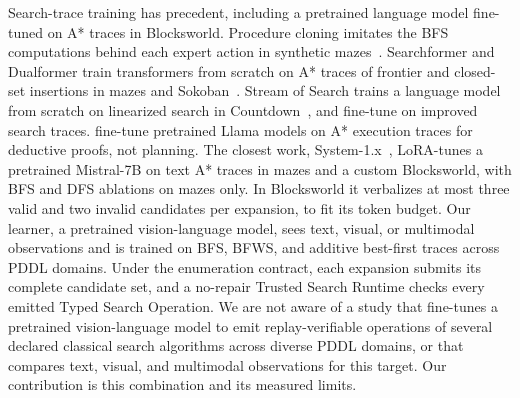 Search-trace training has precedent, including a pretrained language model fine-tuned on A* traces in Blocksworld. Procedure cloning imitates the BFS computations behind each expert action in synthetic mazes~\citep{yang2022chain}. Searchformer and Dualformer train transformers from scratch on A* traces of frontier and closed-set insertions in mazes and Sokoban~\citep{lehnert2024beyond,su2024dualformer}. Stream of Search trains a language model from scratch on linearized search in Countdown~\citep{gandhi2024stream}, and \citet{moon2024learning} fine-tune on improved search traces. \citet{opedal2026learning} fine-tune pretrained Llama models on A* execution traces for deductive proofs, not planning. The closest work, System-1.x~\citep{saha2024system1x}, LoRA-tunes a pretrained Mistral-7B on text A* traces in mazes and a custom Blocksworld, with BFS and DFS ablations on mazes only. In Blocksworld it verbalizes at most three valid and two invalid candidates per expansion, to fit its token budget. Our learner, a pretrained vision-language model, sees text, visual, or multimodal observations and is trained on BFS, BFWS, and additive best-first traces across PDDL domains. Under the enumeration contract, each expansion submits its complete candidate set, and a no-repair Trusted Search Runtime checks every emitted Typed Search Operation. We are not aware of a study that fine-tunes a pretrained vision-language model to emit replay-verifiable operations of several declared classical search algorithms across diverse PDDL domains, or that compares text, visual, and multimodal observations for this target. Our contribution is this combination and its measured limits.
